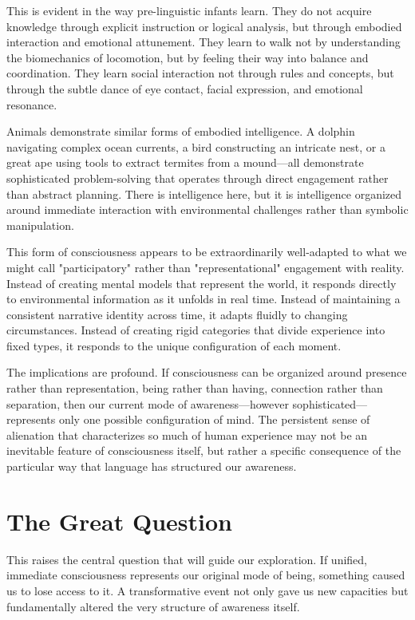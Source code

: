 This is evident in the way pre-linguistic infants learn. They do not acquire knowledge through explicit instruction or logical analysis, but through embodied interaction and emotional attunement. They learn to walk not by understanding the biomechanics of locomotion, but by feeling their way into balance and coordination. They learn social interaction not through rules and concepts, but through the subtle dance of eye contact, facial expression, and emotional resonance.

Animals demonstrate similar forms of embodied intelligence. A dolphin navigating complex ocean currents, a bird constructing an intricate nest, or a great ape using tools to extract termites from a mound—all demonstrate sophisticated problem-solving that operates through direct engagement rather than abstract planning. There is intelligence here, but it is intelligence organized around immediate interaction with environmental challenges rather than symbolic manipulation.

This form of consciousness appears to be extraordinarily well-adapted to what we might call "participatory" rather than "representational" engagement with reality. Instead of creating mental models that represent the world, it responds directly to environmental information as it unfolds in real time. Instead of maintaining a consistent narrative identity across time, it adapts fluidly to changing circumstances. Instead of creating rigid categories that divide experience into fixed types, it responds to the unique configuration of each moment.

The implications are profound. If consciousness can be organized around presence rather than representation, being rather than having, connection rather than separation, then our current mode of awareness—however sophisticated—represents only one possible configuration of mind. The persistent sense of alienation that characterizes so much of human experience may not be an inevitable feature of consciousness itself, but rather a specific consequence of the particular way that language has structured our awareness.

\section{The Great Question}

This raises the central question that will guide our exploration. If unified, immediate consciousness represents our original mode of being, something caused us to lose access to it. A transformative event not only gave us new capacities but fundamentally altered the very structure of awareness itself.

